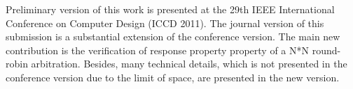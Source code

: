 Preliminary version of this work is presented at the 29th IEEE
International Conference on Computer Design (ICCD 2011). The journal
version of this submission is a substantial extension of the
conference version. The main new contribution is the verification of
response property property of a N*N round-robin arbitration.
Besides, many technical details, which is not presented in the
conference version due to the limit of space, are presented in the
new version.
